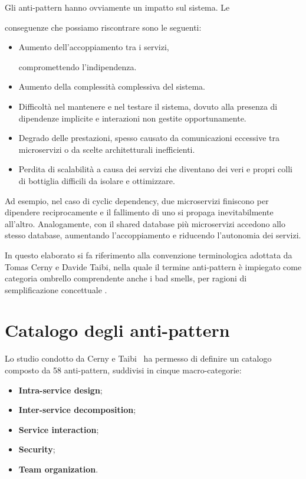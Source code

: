 Gli anti-pattern hanno ovviamente un impatto sul sistema. Le 

conseguenze che possiamo riscontrare sono le seguenti:
\begin{itemize}
    \item Aumento dell'accoppiamento tra i servizi, 
    
    compromettendo l'indipendenza.
    \item Aumento della complessità complessiva del sistema. 
    \item Difficoltà nel mantenere e nel testare il sistema, dovuto alla presenza di dipendenze implicite e interazioni non gestite opportunamente. 
    \item Degrado delle prestazioni, spesso causato da comunicazioni eccessive tra microservizi o da scelte architetturali inefficienti.
    \item Perdita di scalabilità a causa dei servizi che diventano dei veri e propri colli di bottiglia  difficili da isolare e ottimizzare. 
\end{itemize}

Ad esempio, nel caso di cyclic dependency, due microservizi finiscono per dipendere reciprocamente e il fallimento di uno si propaga inevitabilmente all’altro. Analogamente, con il shared database più microservizi accedono allo stesso database, aumentando l’accoppiamento e riducendo l’autonomia dei servizi.

In questo elaborato si fa riferimento alla convenzione terminologica adottata da Tomas Cerny e Davide Taibi, nella quale il termine anti-pattern è impiegato come categoria ombrello comprendente anche i bad smells, per ragioni di semplificazione concettuale \cite{CernyCatalogo}.

\section{Catalogo degli anti-pattern}

Lo studio condotto da Cerny e Taibi~\cite{CernyCatalogo} ha permesso di definire un catalogo composto da 58 anti-pattern, suddivisi in cinque macro-categorie:
\begin{itemize}
  \item \textbf{Intra-service design};
  \item \textbf{Inter-service decomposition};
  \item \textbf{Service interaction};
  \item \textbf{Security};
  \item \textbf{Team organization}.
\end{itemize}


